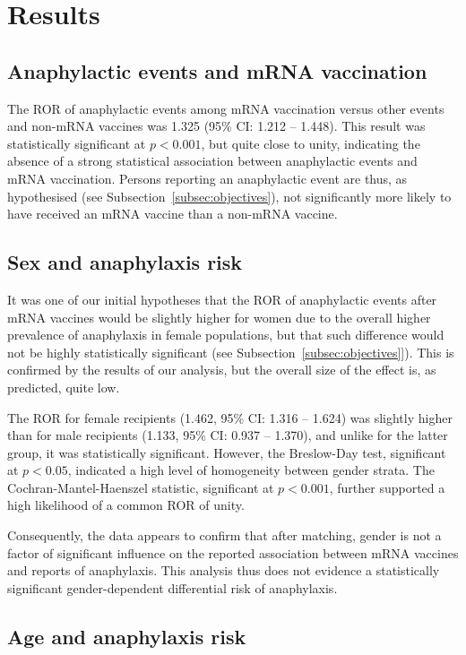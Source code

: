 \documentclass{article}
\begin{document}
\section{Results}

\subsection{Anaphylactic events and mRNA vaccination}

The ROR of anaphylactic events among mRNA vaccination versus other events and non-mRNA vaccines was 1.325 (95\% CI: 1.212 -- 1.448).
This result was statistically significant at $p < 0.001$, but quite close to unity, indicating the absence of a strong statistical association between anaphylactic events and mRNA vaccination.
Persons reporting an anaphylactic event are thus, as hypothesised (see Subsection~\ref{subsec:objectives}), not significantly more likely to have received an mRNA vaccine than a non-mRNA vaccine.

\subsection{Sex and anaphylaxis risk}

It was one of our initial hypotheses that the ROR of anaphylactic events after mRNA vaccines would be slightly higher for women due to the overall higher prevalence of anaphylaxis in female populations, but that such difference would not be highly statistically significant (see Subsection~\ref{subsec:objectives}]).
This is confirmed by the results of our analysis, but the overall size of the effect is, as predicted, quite low.

The ROR for female recipients (1.462, 95\% CI: 1.316 -- 1.624) was slightly higher than for male recipients (1.133, 95\% CI: 0.937 -- 1.370), and unlike for the latter group, it was statistically significant.
However, the Breslow-Day test, significant at $p < 0.05$, indicated a high level of homogeneity between gender strata.
The Cochran-Mantel-Haenszel statistic, significant at $p < 0.001$, further supported a high likelihood of a common ROR of unity.

Consequently, the data appears to confirm that after matching, gender is not a factor of significant influence on the reported association between mRNA vaccines and reports of anaphylaxis.
This analysis thus does not evidence a statistically significant gender-dependent differential risk of anaphylaxis.

\subsection{Age and anaphylaxis risk}
\end{document}
